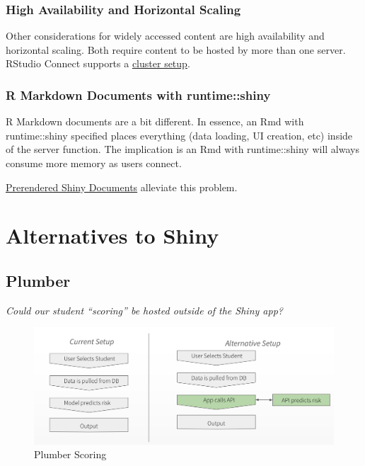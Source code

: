 \documentclass[]{book}
\theoremstyle{definition}
\theoremstyle{definition}
\theoremstyle{definition}
\theoremstyle{remark}
\begin{document}
\hypertarget{high-availability-and-horizontal-scaling}{%
\subsection{High Availability and Horizontal
Scaling}\label{high-availability-and-horizontal-scaling}}

Other considerations for widely accessed content are high availability
and horizontal scaling. Both require content to be hosted by more than
one server. RStudio Connect supports a
\href{https://docs.rstudio.com/connect/admin/high-availability.html}{cluster
setup}.

\hypertarget{r-markdown-documents-with-runtimeshiny}{%
\subsection{R Markdown Documents with
runtime::shiny}\label{r-markdown-documents-with-runtimeshiny}}

R Markdown documents are a bit different. In essence, an Rmd with
runtime::shiny specified places everything (data loading, UI creation,
etc) inside of the server function. The implication is an Rmd with
runtime::shiny will always consume more memory as users connect.

\href{https://rmarkdown.rstudio.com/authoring_shiny_prerendered.html}{Prerendered
Shiny Documents} alleviate this problem.

\hypertarget{alternatives-to-shiny}{%
\chapter{Alternatives to Shiny}\label{alternatives-to-shiny}}

\hypertarget{plumber}{%
\section{Plumber}\label{plumber}}

\emph{Could our student ``scoring'' be hosted outside of the Shiny app?}

\begin{figure}
\centering
\includegraphics{imgs/shiny-alt/plumber-alt.png}
\caption{Plumber Scoring}
\end{figure}
\end{document}
